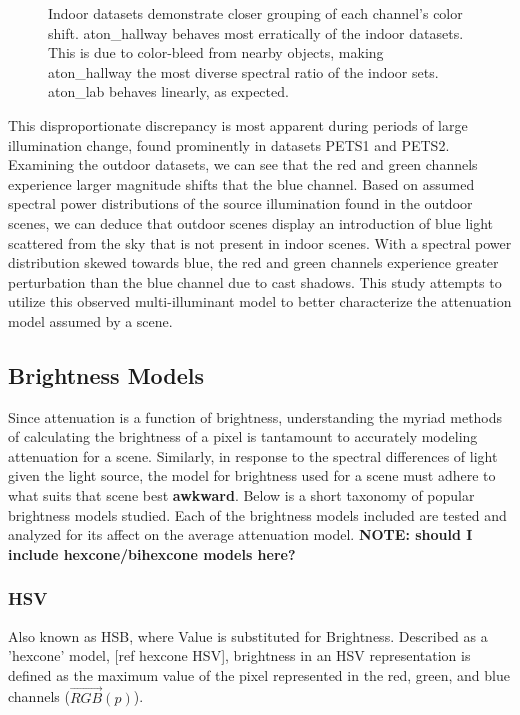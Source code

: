 \documentclass[12pt]{report}
\begin{document}
\begin{figure}
\caption{Indoor datasets demonstrate closer grouping of each channel's color shift. aton\_hallway behaves most erratically of the indoor datasets. This is due to color-bleed from nearby objects, making aton\_hallway the most diverse spectral ratio of the indoor sets. aton\_lab behaves linearly, as expected.}
\label{fig:rgshift_indoor}
\end{figure}

This disproportionate discrepancy is most apparent during periods of large illumination change, found prominently in datasets PETS1 and PETS2. Examining the outdoor datasets, we can see that the red and green channels experience larger magnitude shifts that the blue channel. Based on assumed spectral power distributions of the source illumination found in the outdoor scenes, we can deduce that outdoor scenes display an introduction of blue light scattered from the sky that is not present in indoor scenes. With a spectral power distribution skewed towards blue, the red and green channels experience greater perturbation than the blue channel due to cast shadows. This study attempts to utilize this observed multi-illuminant model to better characterize the attenuation model assumed by a scene. 

\subsection{Brightness Models} \label{section:brightnessmodels}

Since attenuation is a function of brightness, understanding the myriad methods of calculating the brightness of a pixel is tantamount to accurately modeling attenuation for a scene. Similarly, in response to the spectral differences of light given the light source, the model for brightness used for a scene must adhere to what suits that scene best \textbf{awkward}. Below is a short taxonomy of popular brightness models studied. Each of the brightness models included are tested and analyzed for its affect on the average attenuation model. \textbf{NOTE: should I include hexcone/bihexcone models here?}

\subsubsection{HSV}

Also known as HSB, where Value is substituted for Brightness. Described as a 'hexcone' model, [ref hexcone HSV], brightness in an HSV representation is defined as the maximum value of the pixel represented in the red, green, and blue channels ($\vec{RGB}(p)$).
\end{document}
